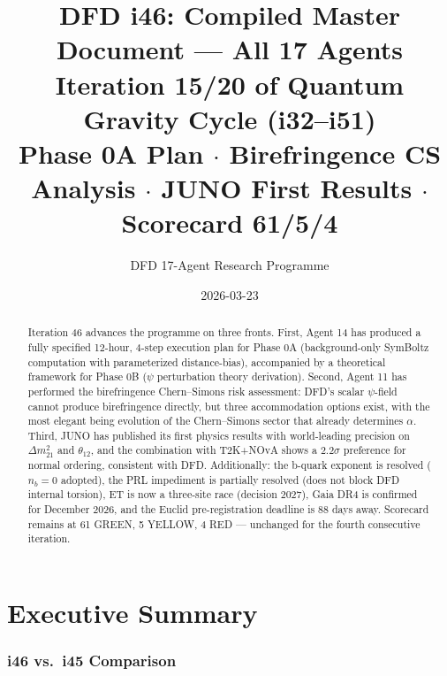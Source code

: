 \documentclass[11pt,a4paper]{article}
\title{DFD i46: Compiled Master Document --- All 17 Agents\\[6pt]
\large Iteration 15/20 of Quantum Gravity Cycle (i32--i51)\\[6pt]
\normalsize Phase 0A Plan $\cdot$ Birefringence CS Analysis $\cdot$ JUNO First Results $\cdot$ Scorecard 61/5/4}
\author{DFD 17-Agent Research Programme}
\date{2026-03-23}
\begin{document}
\maketitle

\begin{abstract}
Iteration 46 advances the programme on three fronts. First, Agent 14 has produced a fully specified 12-hour, 4-step execution plan for Phase 0A (background-only SymBoltz computation with parameterized distance-bias), accompanied by a theoretical framework for Phase 0B ($\psi$ perturbation theory derivation). Second, Agent 11 has performed the birefringence Chern--Simons risk assessment: DFD's scalar $\psi$-field cannot produce birefringence directly, but three accommodation options exist, with the most elegant being evolution of the Chern--Simons sector that already determines $\alpha$. Third, JUNO has published its first physics results with world-leading precision on $\Delta m^2_{21}$ and $\theta_{12}$, and the combination with T2K+NOvA shows a $2.2\sigma$ preference for normal ordering, consistent with DFD. Additionally: the b-quark exponent is resolved ($n_b = 0$ adopted), the PRL impediment is partially resolved (does not block DFD internal torsion), ET is now a three-site race (decision 2027), Gaia DR4 is confirmed for December 2026, and the Euclid pre-registration deadline is 88 days away. Scorecard remains at 61 GREEN, 5 YELLOW, 4 RED --- unchanged for the fourth consecutive iteration.
\end{abstract}

\tableofcontents
\newpage

\part{Executive Summary}

\section{i46 vs.\ i45 Comparison}
\end{document}
